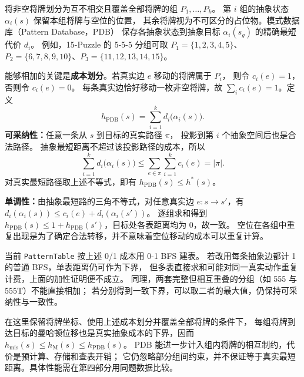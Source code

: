 \par\vspace{2bp}

将非空将牌划分为互不相交且覆盖全部将牌的组 $P_1,\ldots,P_k$。
第 $i$ 组的抽象状态 $\alpha_i(s)$ 保留本组将牌与空位的位置，
其余将牌视为不可区分的占位物。模式数据库（Pattern Database，PDB）
保存各抽象状态到抽象目标 $\alpha_i(s_g)$ 的精确最短代价 $d_i$。
例如，15-Puzzle 的 5-5-5 分组可取
$P_1=\{1,2,3,4,5\}$、$P_2=\{6,7,8,9,10\}$、$P_3=\{11,12,13,14,15\}$。

能够相加的关键是\textbf{成本划分}。若真实边 $e$ 移动的将牌属于 $P_i$，
则令 $c_i(e)=1$，否则令 $c_i(e)=0$。
每条真实边恰好移动一枚非空将牌，故 $\sum_i c_i(e)=1$。定义
\[
h_{\mathrm{PDB}}(s)=\sum_{i=1}^{k}d_i\bigl(\alpha_i(s)\bigr).
\]
\textbf{可采纳性：}任意一条从 $s$ 到目标的真实路径 $\pi$，
投影到第 $i$ 个抽象空间后也是合法路径。
抽象最短距离不超过该投影路径的成本，所以
\[
\sum_{i=1}^{k}d_i\bigl(\alpha_i(s)\bigr)
\leq\sum_{e\in\pi}\sum_{i=1}^{k}c_i(e)
=|\pi|.
\]
对真实最短路径取上述不等式，即有 $h_{\mathrm{PDB}}(s)\leq h^*(s)$。

\textbf{单调性：}由抽象最短路的三角不等式，对任意真实边 $e:s\to s'$，有
$d_i(\alpha_i(s))\leq c_i(e)+d_i(\alpha_i(s'))$。
逐组求和得到 $h_{\mathrm{PDB}}(s)\leq1+h_{\mathrm{PDB}}(s')$，目标处各表距离均为 0，故一致。
空位在各组中重复出现是为了确定合法转移，并不意味着空位移动的成本可以重复计算。

当前 \texttt{PatternTable} 按上述 0/1 成本用 0-1 BFS 建表。
若改用每条抽象边都计 1 的普通 BFS，单表距离仍可作为下界，
但多表直接求和可能对同一真实动作重复计费，上面的加性证明便不成立。
同理，两套完整但相互重叠的分组（如 555 与 555T）不能直接相加；
若分别得到一致下界，可以取二者的最大值，仍保持可采纳性与一致性。

在这里保留将牌坐标、使用上述成本划分并覆盖全部将牌的条件下，
每组将牌到达目标的曼哈顿位移也是真实抽象成本的下界，因而
$h_{\mathrm{mis}}(s)\leq h_{\mathrm{M}}(s)\leq h_{\mathrm{PDB}}(s)$。
PDB 能进一步计入组内将牌的相互制约，代价是预计算、存储和查表开销；
它仍忽略部分组间约束，并不保证等于真实最短距离。具体性能需在第四部分用同题数据比较。

